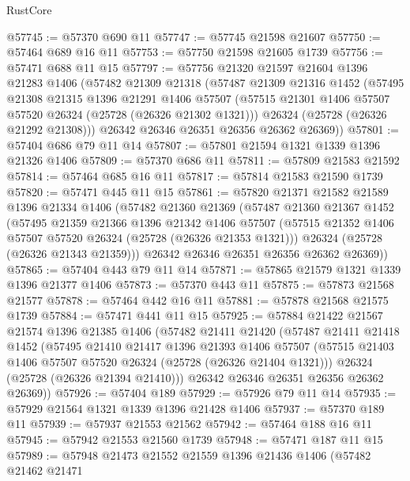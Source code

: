 \begin{lexlean}{RustCore}
\begin{coremodule}
@57745 := @57370 @690 @11
@57747 := @57745 @21598 @21607
@57750 := @57464 @689 @16 @11
@57753 := @57750 @21598 @21605 @1739
@57756 := @57471 @688 @11 @15
@57797 := @57756
    @21320
    @21597
    @21604
    @1396
    @21283
    @1406
    (@57482
      @21309
      @21318
      (@57487
        @21309
        @21316
        @1452
        (@57495
          @21308
          @21315
          @1396
          @21291
          @1406
          @57507
          (@57515 @21301 @1406 @57507 @57520 @26324 (@25728 (@26326 @21302 @1321)))
          @26324
          (@25728 (@26326 @21292 @21308)))
        @26342
        @26346
        @26351
        @26356
        @26362
        @26369))
@57801 := @57404 @686 @79 @11 @14
@57807 := @57801 @21594 @1321 @1339 @1396 @21326 @1406
@57809 := @57370 @686 @11
@57811 := @57809 @21583 @21592
@57814 := @57464 @685 @16 @11
@57817 := @57814 @21583 @21590 @1739
@57820 := @57471 @445 @11 @15
@57861 := @57820
    @21371
    @21582
    @21589
    @1396
    @21334
    @1406
    (@57482
      @21360
      @21369
      (@57487
        @21360
        @21367
        @1452
        (@57495
          @21359
          @21366
          @1396
          @21342
          @1406
          @57507
          (@57515 @21352 @1406 @57507 @57520 @26324 (@25728 (@26326 @21353 @1321)))
          @26324
          (@25728 (@26326 @21343 @21359)))
        @26342
        @26346
        @26351
        @26356
        @26362
        @26369))
@57865 := @57404 @443 @79 @11 @14
@57871 := @57865 @21579 @1321 @1339 @1396 @21377 @1406
@57873 := @57370 @443 @11
@57875 := @57873 @21568 @21577
@57878 := @57464 @442 @16 @11
@57881 := @57878 @21568 @21575 @1739
@57884 := @57471 @441 @11 @15
@57925 := @57884
    @21422
    @21567
    @21574
    @1396
    @21385
    @1406
    (@57482
      @21411
      @21420
      (@57487
        @21411
        @21418
        @1452
        (@57495
          @21410
          @21417
          @1396
          @21393
          @1406
          @57507
          (@57515 @21403 @1406 @57507 @57520 @26324 (@25728 (@26326 @21404 @1321)))
          @26324
          (@25728 (@26326 @21394 @21410)))
        @26342
        @26346
        @26351
        @26356
        @26362
        @26369))
@57926 := @57404 @189
@57929 := @57926 @79 @11 @14
@57935 := @57929 @21564 @1321 @1339 @1396 @21428 @1406
@57937 := @57370 @189 @11
@57939 := @57937 @21553 @21562
@57942 := @57464 @188 @16 @11
@57945 := @57942 @21553 @21560 @1739
@57948 := @57471 @187 @11 @15
@57989 := @57948
    @21473
    @21552
    @21559
    @1396
    @21436
    @1406
    (@57482
      @21462
      @21471

\end{coremodule}
\end{lexlean}
